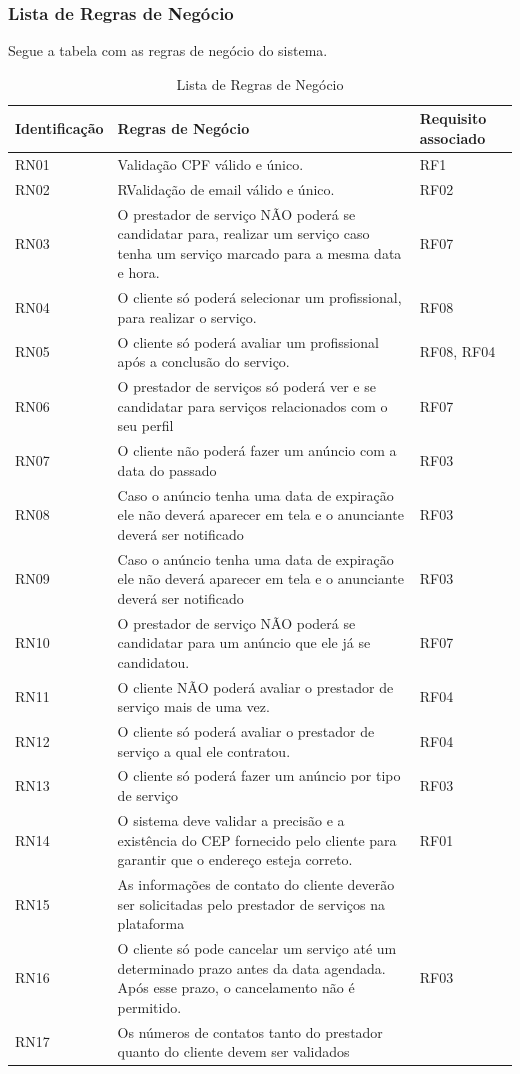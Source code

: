 \subsubsection{ Lista de Regras de Negócio}
Segue a tabela com as regras de negócio do sistema.
\clearpage
\begin{table}[htb]
	\centering
	\caption{\label{Formatação do texto.}Lista de Regras de Negócio}
	\begin{tabular}{|l|p{8cm}|p{3cm}|}
		\hline
		\textbf{Identificação} & \textbf{Regras de Negócio} & \textbf{Requisito associado} \\ \hline
		RN01 & Validação CPF válido e único. & RF1 \\ \hline
		RN02 & RValidação de email válido e único. & RF02 \\ \hline
		RN03 & O prestador de serviço NÃO poderá se candidatar para, realizar um serviço caso tenha um serviço marcado para a mesma data e hora. & RF07 \\ \hline
		RN04 & O cliente só poderá selecionar um profissional, para realizar o serviço. & RF08 \\ \hline
		RN05 & O cliente só poderá avaliar um profissional após a conclusão do serviço. & RF08, RF04 \\ \hline
		RN06 & O prestador de serviços só poderá ver e se candidatar para serviços relacionados com o seu perfil  & RF07 \\ \hline
		RN07 & O cliente não poderá fazer um anúncio com a data do passado  & RF03 \\ \hline
		RN08 & Caso o anúncio tenha uma data de expiração ele não deverá aparecer em tela e o anunciante deverá ser notificado & RF03 \\ \hline
		RN09 & Caso o anúncio tenha uma data de expiração ele não deverá aparecer em tela e o anunciante deverá ser notificado & RF03 \\ \hline
		RN10 & O prestador de serviço NÃO poderá se candidatar para um anúncio que ele já se candidatou.  & RF07 \\ \hline
		RN11 & O cliente NÃO poderá avaliar o prestador de serviço  mais de uma vez.  & RF04 \\ \hline
		RN12 & O cliente só poderá avaliar o prestador de serviço a qual ele contratou.  & RF04 \\ \hline
		RN13 & O cliente só poderá fazer um anúncio por tipo de serviço  & RF03 \\ \hline
		RN14 & O sistema deve validar a precisão e a existência do CEP fornecido pelo cliente para garantir que o endereço esteja correto.  & RF01 \\ \hline
		RN15 & As informações de contato do cliente deverão ser solicitadas pelo prestador de serviços na plataforma  &  \\ \hline
		RN16 & O cliente só pode cancelar um serviço até um determinado prazo antes da data agendada. Após esse prazo, o cancelamento não é permitido.  & RF03 \\ \hline
		RN17 &Os números de contatos tanto do prestador quanto do cliente devem ser validados
		&  \\ \hline


\end{tabular}
\end{table}
